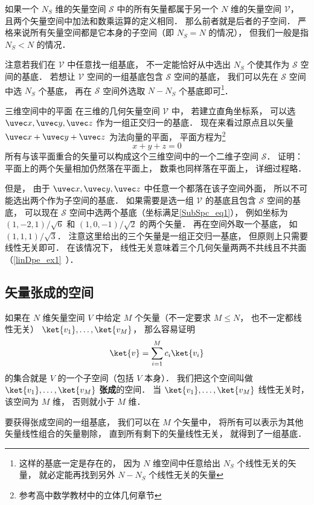 

如果一个 $N_S$ 维的矢量空间 $\mathcal S$ 中的所有矢量都属于另一个 $N$ 维的矢量空间 $\mathcal V$， 且两个矢量空间中加法和数乘运算的定义相同． 那么前者就是后者的子空间． 严格来说所有矢量空间都是它本身的子空间（即 $N_S = N$ 的情况）， 但我们一般是指 $N_S < N$ 的情况．

注意若我们在 $\mathcal V$ 中任意找一组基底， 不一定能恰好从中选出 $N_S$ 个使其作为 $\mathcal S$ 空间的基底． 若想让 $\mathcal V$ 空间的一组基底包含 $\mathcal S$ 空间的基底， 我们可以先在 $\mathcal S$ 空间中选 $N_S$ 个基底， 再在 $\mathcal S$ 空间外选取 $N - N_S$ 个基底即可\footnote{这样的基底一定是存在的， 因为 $N$ 维空间中任意给出 $N_S$ 个线性无关的矢量， 就必定能再找到另外 $N - N_S$ 个线性无关的矢量}．

\begin{example}{三维空间中的平面}
在三维的几何矢量空间 $\mathcal V$ 中， 若建立直角坐标系， 可以选 $\uvec x, \uvec y, \uvec z$ 作为一组正交归一的基底． 现在来看过原点且以矢量 $\uvec x + \uvec y + \uvec z$ 为法向量的平面， 平面方程为\footnote{参考高中数学教材中的立体几何章节}
\begin{equation}\label{SubSpc_eq1}
x + y + z = 0
\end{equation}
所有与该平面重合的矢量可以构成这个三维空间中的一个二维子空间 $\mathcal S$． 证明： 平面上的两个矢量相加仍然落在平面上， 数乘也同样落在平面上， 详细过程略． 

但是， 由于 $\uvec x, \uvec y, \uvec z$ 中任意一个都落在该子空间外面， 所以不可能选出两个作为子空间的基底． 如果需要是选一组 $\mathcal V$ 的基底且包含 $\mathcal S$ 空间的基底， 可以现在 $\mathcal S$ 空间中选两个基底（坐标满足\autoref{SubSpc_eq1}）， 例如坐标为 $(1, -2, 1)/\sqrt{6}$ 和 $(1, 0, -1)/\sqrt{2}$ 的两个矢量． 再在空间外取一个基底， 如 $(1, 1, 1)/\sqrt{3}$． 注意这里给出的三个矢量是一组正交归一基底， 但原则上只需要线性无关即可． 在该情况下， 线性无关意味着三个几何矢量两两不共线且不共面（\autoref{linDpe_ex1}~）．
\end{example}

\subsection{矢量张成的空间}
如果在 $N$ 维矢量空间 $V$ 中给定 $M$ 个矢量（不一定要求 $M \leqslant N$， 也不一定都线性无关） $\ket{v_1}, \dots, \ket{v_M}$， 那么容易证明
\begin{equation}
\ket{v} = \sum_{i=1}^M c_i \ket{v_i}
\end{equation}
的集合就是 $V$ 的一个子空间（包括 $V$ 本身）． 我们把这个空间叫做 $\ket{v_1}, \dots, \ket{v_M}$ \textbf{张成}的空间． 当 $\ket{v_1}, \dots, \ket{v_M}$ 线性无关时， 该空间为 $M$ 维， 否则就小于 $M$ 维．

要获得张成空间的一组基底， 我们可以在 $M$ 个矢量中， 将所有可以表示为其他矢量线性组合的矢量剔除， 直到所有剩下的矢量线性无关， 就得到了一组基底．
